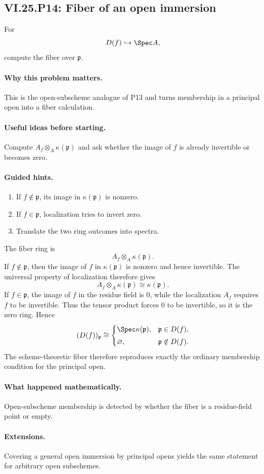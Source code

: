 \subsection*{VI.25.P14: Fiber of an open immersion}
\begin{problem}\label{prob:vi25-p14}
For
\[
D(f)\hookrightarrow\Spec A,
\]
compute the fiber over \(\mathfrak p\).
\end{problem}

\ifdefined\FullProblemDossiers
\paragraph{Why this problem matters.}
This is the open-subscheme analogue of P13 and turns membership in a principal open into a fiber calculation.

\paragraph{Useful ideas before starting.}
Compute \(A_f\otimes_A\kappa(\mathfrak p)\) and ask whether the image of \(f\) is already invertible or becomes zero.

\paragraph{Guided hints.}
\begin{enumerate}
\item If \(f\notin\mathfrak p\), its image in \(\kappa(\mathfrak p)\) is nonzero.
\item If \(f\in\mathfrak p\), localization tries to invert zero.
\item Translate the two ring outcomes into spectra.
\end{enumerate}

\begin{solution}
The fiber ring is
\[
A_f\otimes_A\kappa(\mathfrak p).
\]
If \(f\notin\mathfrak p\), then the image of \(f\) in \(\kappa(\mathfrak p)\) is nonzero and hence invertible.  The universal property of localization therefore gives
\[
A_f\otimes_A\kappa(\mathfrak p)\cong\kappa(\mathfrak p).
\]
If \(f\in\mathfrak p\), the image of \(f\) in the residue field is \(0\), while the localization \(A_f\) requires \(f\) to be invertible.  Thus the tensor product forces \(0\) to be invertible, so it is the zero ring.  Hence
\[
(D(f))_{\mathfrak p}
\cong
\begin{cases}
\Spec\kappa(\mathfrak p), & \mathfrak p\in D(f),\\[3pt]
\varnothing, & \mathfrak p\notin D(f).
\end{cases}
\]
The scheme-theoretic fiber therefore reproduces exactly the ordinary membership condition for the principal open.
\end{solution}

\paragraph{What happened mathematically.}
Open-subscheme membership is detected by whether the fiber is a residue-field point or empty.

\paragraph{Extensions.}
Covering a general open immersion by principal opens yields the same statement for arbitrary open subschemes.
\fi
